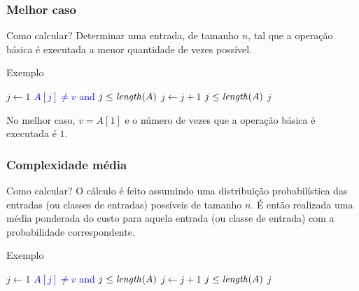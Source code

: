 \documentclass[handout]{beamer}
\begin{document}
\begin{frame}
\frametitle{Melhor caso}

\begin{block}{Como calcular?}
Determinar uma entrada, de tamanho $n$, tal que a operação básica é executada a menor quantidade de vezes possível.
\end{block}

\begin{block}{Exemplo}
\begin{codebox}
\li $j \gets 1$
\li \While \textcolor{blue}{$A[j] \neq v$ and $j \le \id{length}(A)$}
\li \Do
      $j \gets j+1$
    \End
\li \If $j \le \id{length}(A)$
\li \Then
      \Return $j$
\li \Else
      \Return {}
    \End
\end{codebox}
No melhor caso, $v = A[1]$ e o número de vezes que a operação básica é
executada é $1$.
\end{block}

\end{frame}

\begin{frame}
\frametitle{Complexidade média}

\begin{block}{Como calcular?}
  O cálculo é feito assumindo uma distribuição probabilística das entradas (ou
  classes de entradas) possíveis de tamanho $n$. É então realizada uma média
  ponderada do custo para aquela entrada (ou classe de entrada) com a
  probabilidade correspondente.
\end{block}

\begin{block}{Exemplo}
\begin{codebox}
\li $j \gets 1$
\li \While \textcolor{blue}{$A[j] \neq v$ and $j \le \id{length}(A)$}
\li \Do
      $j \gets j+1$
    \End
\li \If $j \le \id{length}(A)$
\li \Then
      \Return $j$
\li \Else
      \Return {}
    \End
\end{codebox}
\end{block}
\end{frame}
\end{document}
